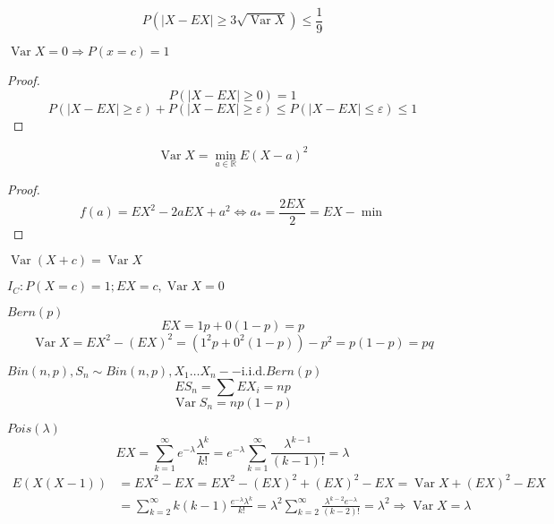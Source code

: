 \documentclass{article}
\DeclareMathOperator{\Var}{Var}
\begin{document}
    \begin{remark}
        $$ P(|X-EX| \ge 3 \sqrt{\Var X})\le \frac{1}{9}$$
    \end{remark}
    \begin{property}
        $\Var X = 0 \Rightarrow P(x=c) = 1$
        \begin{proof}
            $$ P(|X-EX| \ge 0) = 1$$
            $$ P(|X-EX| \ge \varepsilon) + P(|X-EX| \ge\varepsilon) \le P(|X-EX|\le\varepsilon) \le 1$$
        \end{proof}
    \end{property}    
    \begin{property}
        $$\Var X = \min_{a\in\mathbb{R}} E(X-a)^2$$
        \begin{proof}
            $$f(a) = EX^2 - 2aEX + a^2 \Leftrightarrow a_{*} = \frac{2EX}{2} = EX- \min$$
        \end{proof}
    \end{property}
    \begin{property}
        $\Var (X +c) = \Var X$
    \end{property}
    \begin{example}
        $I_C: P(X=c) = 1; EX=c, \Var X = 0$
    \end{example}
    \begin{example}
        $Bern(p)$
        $$ EX = 1p + 0(1-p) = p$$
        $$ \Var X = EX^2 -(EX)^2 = (1^2 p + 0^2 (1-p)) - p^2 = p(1-p) = pq$$
    \end{example}
    \begin{example}
        $Bin(n, p), S_n \sim Bin(n, p), X_1 \dots X_n -- \text{i.i.d.} Bern(p) $
        $$ ES_n = \sum EX_i = np $$
        $$ \Var S_n = np(1-p) $$
    \end{example}
    \begin{example}
        $ Pois(\lambda) $
        $$ EX = \sum\limits_{k=1}^\infty e^{-\lambda} \frac{\lambda^k}{k!} = e^{-\lambda} \sum\limits_{k=1}^\infty \frac{\lambda^{k-1}}{(k-1)!} = \lambda $$
        \begin{align*}
        E(X(X-1)) &=EX^2 - EX = EX^2 - (EX)^2 + (EX)^2 -EX = \Var X + (EX)^2 -EX \\ &= \sum\limits_{k=2}^\infty k(k-1) \frac{e^{-\lambda} \lambda^k}{k!} =
        \lambda^2 \sum\limits_{k=2}^\infty \frac{\lambda^{k-2}e^{-\lambda}}{(k-2)!} = \lambda^2 \Rightarrow \Var X = \lambda
        \end{align*} 
    \end{example}
\end{document}
